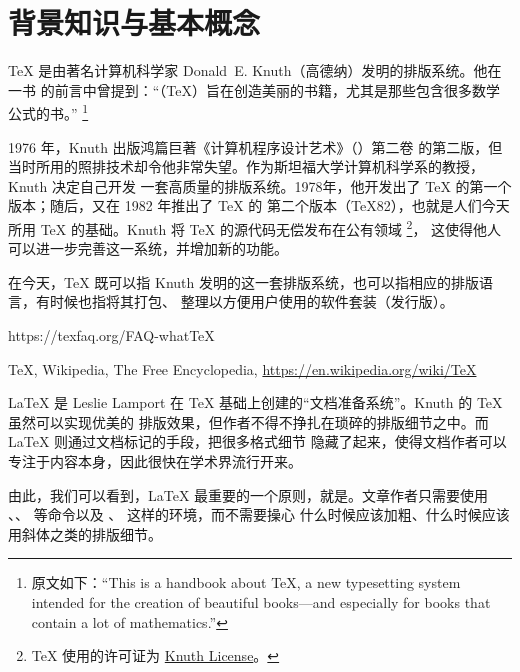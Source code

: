 
\section{背景知识与基本概念}
\label{sec:basic}


\TeX{} 是由著名计算机科学家 Donald~E. Knuth（高德纳）发明的排版系统。他在  一书
的前言中曾提到：“（\TeX{}）旨在创造美丽的书籍，尤其是那些包含很多数学公式的书。”
\footnote{原文如下：“This is a handbook about \TeX{}, a new typesetting system intended for the
creation of beautiful books---and especially for books that contain a lot of mathematics.”}

1976 年，Knuth 出版鸿篇巨著《计算机程序设计艺术》（）第二卷
的第二版，但当时所用的照排技术却令他非常失望。作为斯坦福大学计算机科学系的教授，Knuth 决定自己开发
一套高质量的排版系统。1978年，他开发出了 \TeX{} 的第一个版本；随后，又在 1982 年推出了 \TeX{} 的
第二个版本（\TeX 82），也就是人们今天所用 \TeX{} 的基础。Knuth 将 \TeX{} 的源代码无偿发布在公有领域
\footnote{\TeX{} 使用的许可证为 \href{https://www.ctan.org/license/knuth}{Knuth License}。}，
这使得他人可以进一步完善这一系统，并增加新的功能。

在今天，\TeX{} 既可以指 Knuth 发明的这一套排版系统，也可以指相应的排版语言，有时候也指将其打包、
整理以方便用户使用的软件套装（发行版）。

\begin{reference}
  \item https://texfaq.org/FAQ-whatTeX
  \item \TeX{}, Wikipedia, The Free Encyclopedia, \url{https://en.wikipedia.org/wiki/TeX}
\end{reference}



\LaTeX{} 是 Leslie Lamport 在 \TeX{} 基础上创建的“文档准备系统”。Knuth 的 \TeX{} 虽然可以实现优美的
排版效果，但作者不得不挣扎在琐碎的排版细节之中。而 \LaTeX{} 则通过文档标记的手段，把很多格式细节
隐藏了起来，使得文档作者可以专注于内容本身，因此很快在学术界流行开来。

由此，我们可以看到，\LaTeX{} 最重要的一个原则，就是。文章作者只需要使用
、、 等命令以及 、 这样的环境，而不需要操心
什么时候应该加粗、什么时候应该用斜体之类的排版细节。

